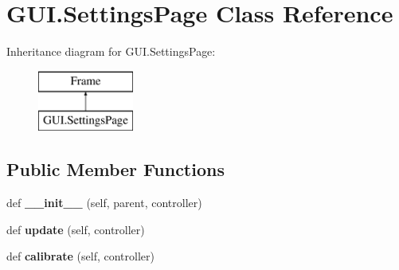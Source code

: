 \hypertarget{class_g_u_i_1_1_settings_page}{}\section{G\+U\+I.\+Settings\+Page Class Reference}
\label{class_g_u_i_1_1_settings_page}
Inheritance diagram for G\+U\+I.\+Settings\+Page\+:\begin{figure}[H]
\begin{center}
\leavevmode
\includegraphics[height=2.000000cm]{class_g_u_i_1_1_settings_page}
\end{center}
\end{figure}
\subsection*{Public Member Functions}
\begin{DoxyCompactItemize}
\item 
\mbox{\label{class_g_u_i_1_1_settings_page_ac0a857a6f98b6e7323e45ad98d33d524}} 
def {\bfseries \+\_\+\+\_\+init\+\_\+\+\_\+} (self, parent, controller)
\item 
\mbox{\label{class_g_u_i_1_1_settings_page_a58dd7d2be050facf80c8d01dd6dc002a}} 
def {\bfseries update} (self, controller)
\item 
\mbox{\label{class_g_u_i_1_1_settings_page_af63ab2ad5c435dd299760591bc65f642}} 
def {\bfseries calibrate} (self, controller)
\end{DoxyCompactItemize}
